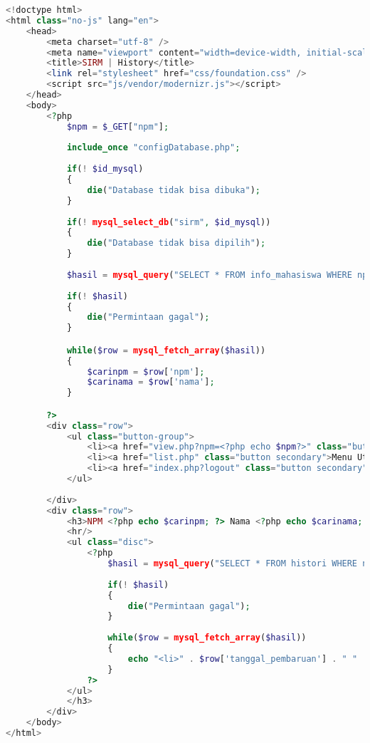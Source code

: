 \begin{lstlisting}[language=php,basicstyle=\tiny,caption=history.php]
<!doctype html>
<html class="no-js" lang="en">
	<head>
		<meta charset="utf-8" />
		<meta name="viewport" content="width=device-width, initial-scale=1.0" />
		<title>SIRM | History</title>
		<link rel="stylesheet" href="css/foundation.css" />
		<script src="js/vendor/modernizr.js"></script>
	</head>
	<body>
		<?php
			$npm = $_GET["npm"];
			
			include_once "configDatabase.php";
				
			if(! $id_mysql)
			{
				die("Database tidak bisa dibuka");
			}
				
			if(! mysql_select_db("sirm", $id_mysql))
			{
				die("Database tidak bisa dipilih");
			}
			
			$hasil = mysql_query("SELECT * FROM info_mahasiswa WHERE npm='$npm'", $id_mysql);
			
			if(! $hasil)
			{
				die("Permintaan gagal");
			}

			while($row = mysql_fetch_array($hasil))
			{
				$carinpm = $row['npm'];
				$carinama = $row['nama'];
			}

		?> 
		<div class="row">
			<ul class="button-group">
				<li><a href="view.php?npm=<?php echo $npm?>" class="button secondary">Kembali</a></li>
				<li><a href="list.php" class="button secondary">Menu Utama</a></li>
				<li><a href="index.php?logout" class="button secondary">Logout</a></li>
			</ul>
			
		</div>
		<div class="row">
			<h3>NPM <?php echo $carinpm; ?> Nama <?php echo $carinama; ?>
			<hr/>
			<ul class="disc">
				<?php
					$hasil = mysql_query("SELECT * FROM histori WHERE npm='$npm' ORDER BY id_histori DESC", $id_mysql);
			
					if(! $hasil)
					{
						die("Permintaan gagal");
					}
					
					while($row = mysql_fetch_array($hasil))
					{
						echo "<li>" . $row['tanggal_pembaruan'] . " " . $row['pengguna'] . " " . $row['status'] . " " . $row['npm'] . " " . ($row['keterangan'] != "" ? '<a href="past.php?id= '. $row['id_histori'] .'">[lihat versi ini]</a>' : "") . "</li>";
					}
				?>
			</ul>
			</h3>
		</div>
	</body>
</html>
\end{lstlisting}

